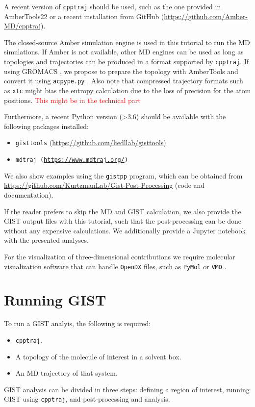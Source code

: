 \documentclass[9pt,tutorial]{livecoms}
\newcommand{\software}{\texttt}
\newcommand{\todo}{\textcolor{red}}
\newcommand\inlinecode{\texttt}
\begin{document}
A recent version of \software{cpptraj} should be used, such as the one provided in AmberTools22 or a recent installation from GitHub (\url{https://github.com/Amber-MD/cpptraj}).

The closed-source Amber simulation engine is used in this tutorial to run the MD simulations.
If Amber is not available, other MD engines can be used as long as topologies and trajectories can be produced in a format supported by \software{cpptraj}.
If using GROMACS \cite{Abraham2015-gromacs,Pronk2013-gromacs}, we propose to prepare the topology with AmberTools and convert it using \software{acpype.py} \cite{Sousa_da_Silva2012-acpype}.
Also note that compressed trajectory formats such as \inlinecode{xtc} might bias the entropy calculation due to the loss of precision for the atom positions. \todo{This might be in the technical part}

Furthermore, a recent Python version (>3.6) should be available with the following packages installed:
\begin{itemize}
	\item \software{gisttools} (\url{https://github.com/liedllab/gisttools})
	\item \software{mdtraj (\url{https://www.mdtraj.org/}) \cite{McGibbon2015-mdtraj}}
\end{itemize}

We also show examples using the \software{gistpp} program, which can be obtained from \url{https://github.com/KurtzmanLab/Gist-Post-Processing} (code and documentation).

If the reader prefers to skip the MD and GIST calculation, we also provide the GIST output files with this tutorial, such that the post-processing can be done without any expensive calculations.
We additionally provide a Jupyter notebook \cite{Kluyver2016-jupyter,Granger2021-jupyter} with the presented analyses. 

For the visualization of three-dimensional contributions we require molecular visualization software that can handle \software{OpenDX} files, such as \software{PyMol} \cite{pymol} or \software{VMD} \cite{vmd}.

\section{Running GIST}
To run a GIST analyis, the following is required:
\begin{itemize}
	\item \software{cpptraj}.
	\item A topology of the molecule of interest in a solvent box.
	\item An MD trajectory of that system.
\end{itemize}
GIST analysis can be divided in three steps: defining a region of interest, running GIST using \software{cpptraj}, and post-processing and analysis.
\cite{Ramsey2016}
\end{document}
